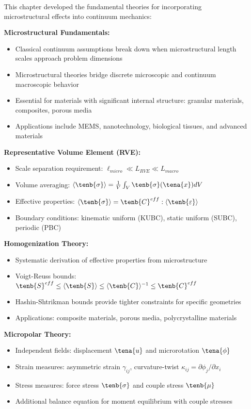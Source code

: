 \begin{subox}[Summary]
This chapter developed the fundamental theories for incorporating microstructural effects into continuum mechanics:

\textbf{Microstructural Fundamentals:}
\begin{itemize}
\item Classical continuum assumptions break down when microstructural length scales approach problem dimensions
\item Microstructural theories bridge discrete microscopic and continuum macroscopic behavior
\item Essential for materials with significant internal structure: granular materials, composites, porous media
\item Applications include MEMS, nanotechnology, biological tissues, and advanced materials
\end{itemize}

\textbf{Representative Volume Element (RVE):}
\begin{itemize}
\item Scale separation requirement: $\ell_{micro} \ll L_{RVE} \ll L_{macro}$
\item Volume averaging: $\langle \tenb{\sigma} \rangle = \frac{1}{V} \int_V \tenb{\sigma}(\tena{x}) dV$
\item Effective properties: $\langle \tenb{\sigma} \rangle = \tenb{C}^{eff} : \langle \tenb{\varepsilon} \rangle$
\item Boundary conditions: kinematic uniform (KUBC), static uniform (SUBC), periodic (PBC)
\end{itemize}

\textbf{Homogenization Theory:}
\begin{itemize}
\item Systematic derivation of effective properties from microstructure
\item Voigt-Reuss bounds: $\tenb{S}^{eff} \leq \langle \tenb{S} \rangle \leq \langle \tenb{C} \rangle^{-1} \leq \tenb{C}^{eff}$
\item Hashin-Shtrikman bounds provide tighter constraints for specific geometries
\item Applications: composite materials, porous media, polycrystalline materials
\end{itemize}

\textbf{Micropolar Theory:}
\begin{itemize}
\item Independent fields: displacement $\tena{u}$ and microrotation $\tena{\phi}$
\item Strain measures: asymmetric strain $\gamma_{ij}$, curvature-twist $\kappa_{ij} = \partial \phi_j/\partial x_i$
\item Stress measures: force stress $\tenb{\sigma}$ and couple stress $\tenb{\mu}$
\item Additional balance equation for moment equilibrium with couple stresses
\end{itemize}


\end{subox}
